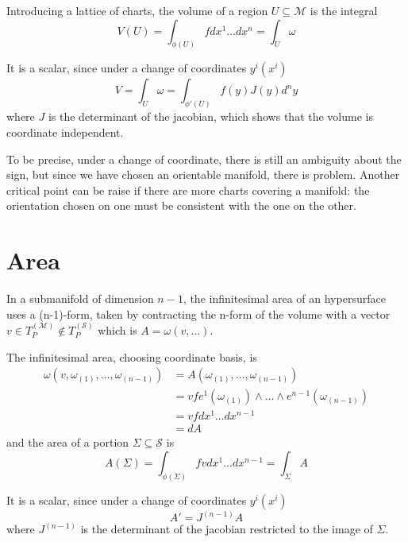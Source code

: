     Introducing a lattice of charts, the volume of a region $U \subseteq \mathcal M$ is the integral 
    \begin{equation*}
        V(U) = \int_{\phi(U)} f dx^1 \ldots dx^n = \int_U \omega 
    \end{equation*}

    It is a scalar, since under a change of coordinates $y^i(x^i)$
    \begin{equation*}
        V = \int_U \omega = \int_{\phi'(U)} f(y) J(y) d^n y
    \end{equation*}
    where $J$ is the determinant of the jacobian, which shows that the volume is coordinate independent. 

    To be precise, under a change of coordinate, there is still an ambiguity about the sign, but since we have chosen an orientable manifold, there is problem. Another critical point can be raise if there are more charts covering a manifold: the orientation chosen on one must be consistent with the one on the other.

\section{Area}

    In a submanifold of dimension $n-1$, the infinitesimal area of an hypersurface uses a (n-1)-form, taken by contracting the n-form of the volume with a vector $v \in T_P^{(\mathcal M)} \notin T_P^{(\mathcal S)}$ which is $A = \omega(v, \ldots)$. 

    The infinitesimal area, choosing coordinate basis, is
    \begin{equation*}
    \begin{aligned}
        \omega (v, \omega_{(1)}, \ldots, \omega_{(n-1)}) & = A(\omega_{(1)}, \ldots, \omega_{(n-1)}) \\ & = v f e^1(\omega_{(1)}) \wedge \ldots \wedge e^{n-1} (\omega_{(n-1)}) \\ & = v f dx^1 \ldots dx^{n-1} \\ & = dA
    \end{aligned}
    \end{equation*}
    and the area of a portion $\Sigma \subseteq \mathcal S$ is 
    \begin{equation*}
        A(\Sigma) = \int_{\phi(\Sigma)} f v dx^1 \ldots dx^{n-1} = \int_{\Sigma} A
    \end{equation*}

    
    It is a scalar, since under a change of coordinates $y^i(x^i)$
    \begin{equation*}
        A' = J^{(n-1)}A
    \end{equation*}
    where $J^{(n-1)}$ is the determinant of the jacobian restricted to the image of $\Sigma$. 

